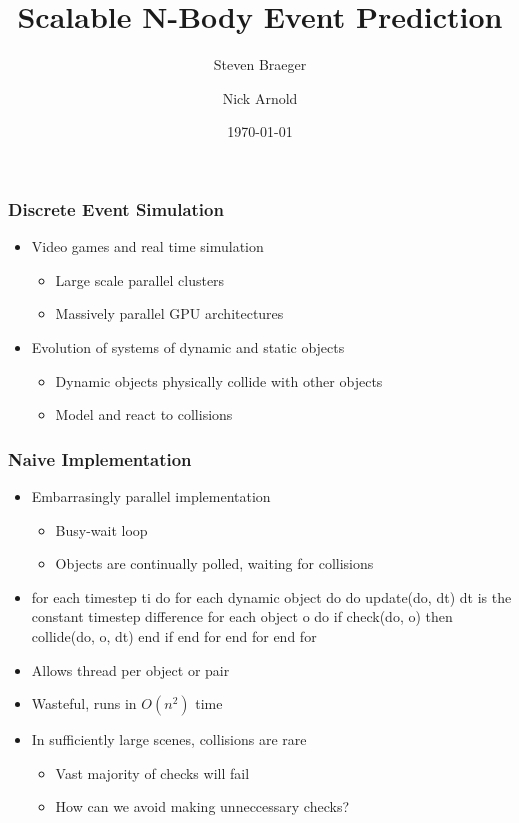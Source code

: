 \documentclass{beamer}
\title{Scalable N-Body Event Prediction}
\author
{Steven Braeger \and Nick Arnold}
\institute
{
  \inst{1}%
  University of Central Florida
}
\date
{\today}
\begin{document}
\frame{\titlepage}

\begin{frame}
	\frametitle{Discrete Event Simulation}
	\begin{itemize}
		\item Video games and real time simulation
		\begin{itemize}
			\item Large scale parallel clusters
			\item Massively parallel GPU architectures
		\end{itemize}
		\item Evolution of systems of dynamic and static objects
		\begin{itemize}
			\item Dynamic objects physically collide with other objects
			\item Model and react to collisions
		\end{itemize}
	\end{itemize}
\end{frame}

\begin{frame}
	\frametitle{Naive Implementation}
	\begin{itemize}
		\item Embarrasingly parallel implementation
		\begin{itemize}
			\item Busy-wait loop
			\item Objects are continually polled, waiting for collisions
		\end{itemize}
		\item
for each timestep ti do
    for each dynamic object do do
        update(do, dt) {dt is the constant timestep difference}
        for each object o do
            if check(do, o) then
                collide(do, o, dt)
            end if
        end for
    end for
end for
		\item Allows thread per object or pair
		\item Wasteful, runs in $O(n ^ 2)$ time 
		\item In sufficiently large scenes, collisions are rare
		\begin{itemize}
			\item Vast majority of checks will fail
			\item How can we avoid making unneccessary checks?
		\end{itemize}
	\end{itemize}

\end{frame}
\end{document}
